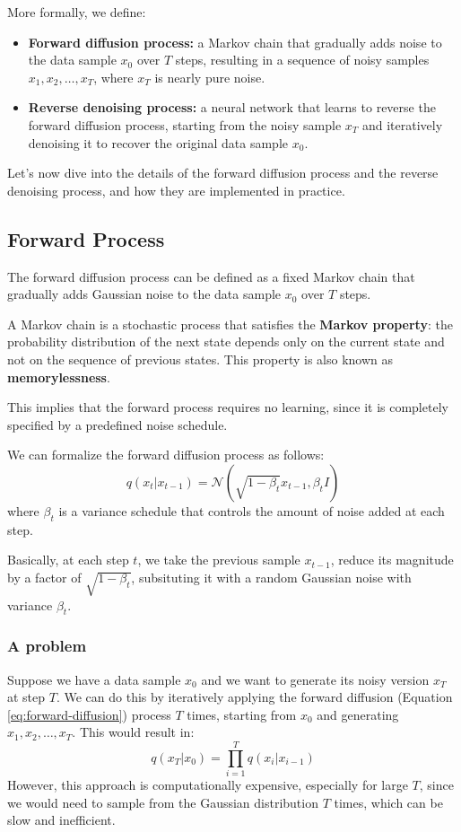 More formally, we define:
\begin{itemize}
    \item \textbf{Forward diffusion process:} a Markov chain that gradually adds noise to the data sample $x_0$ over $T$ steps, 
    resulting in a sequence of noisy samples $x_1, x_2, \ldots, x_T$, where $x_T$ is nearly pure noise.
    \item \textbf{Reverse denoising process:} a neural network that learns to reverse the forward diffusion process,
    starting from the noisy sample $x_T$ and iteratively denoising it to recover the original data sample $x_0$.
\end{itemize}

Let's now dive into the details of the forward diffusion process and the reverse denoising process, and how they are implemented in practice.

\subsection{Forward Process}
The forward diffusion process can be defined as a fixed Markov chain that gradually adds Gaussian noise to the data sample $x_0$ over $T$ steps.

{
    A Markov chain is a stochastic process that satisfies the \textbf{Markov property}: 
    the probability distribution of the next state depends only on the current state and not on the sequence of previous states. 
    This property is also known as \textbf{memorylessness}.
}

This implies that the forward process requires no learning, since it is completely specified by a predefined noise schedule.

We can formalize the forward diffusion process as follows:
\begin{equation}
    \label{eq:forward-diffusion}
    q(x_t | x_{t-1}) = \mathcal{N}(\sqrt{{1 - \beta_t}} x_{t-1}, \beta_t I)
\end{equation}
where $\beta_t$ is a variance schedule that controls the amount of noise added at each step. 

Basically, at each step $t$, we take the previous sample $x_{t-1}$, reduce its magnitude by a factor of $\sqrt{1 - \beta_t}$, subsituting it with a random Gaussian noise with variance $\beta_t$.

\subsubsection{A problem}
Suppose we have a data sample $x_0$ and we want to generate its noisy version $x_T$ at step $T$.
We can do this by iteratively applying the forward diffusion (Equation \ref{eq:forward-diffusion}) process $T$ times, starting from $x_0$ and generating $x_1, x_2, \ldots, x_T$.
This would result in:
\[
    q(x_T | x_0) = \prod_{i=1}^{T} q(x_i | x_{i-1})
\]
However, this approach is computationally expensive, especially for large $T$, since we would need to sample from the Gaussian distribution $T$ times, which can be slow and inefficient.

